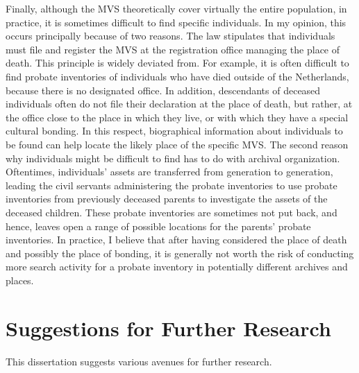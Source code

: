 Finally, although the MVS theoretically cover virtually the entire population, in practice, it is sometimes difficult to find specific individuals. In my opinion, this occurs principally because of two reasons. The law stipulates that individuals must file and register the MVS at the registration office managing the place of death. This principle is widely deviated from. For example, it is often difficult to find probate inventories of individuals who have died outside of the Netherlands, because there is no designated office. In addition, descendants of deceased individuals often do not file their declaration at the place of death, but rather, at the office close to the place in which they live, or with which they have a special cultural bonding. In this respect, biographical information about individuals to be found can help locate the likely place of the specific MVS. The second reason why individuals might be difficult to find has to do with archival organization. Oftentimes, individuals' assets are transferred from generation to generation, leading the civil servants administering the probate inventories to use probate inventories from previously deceased parents to investigate the assets of the deceased children. These probate inventories are sometimes not put back, and hence, leaves open a range of possible locations for the parents' probate inventories. In practice, I believe that after having considered the place of death and possibly the place of bonding, it is generally not worth the risk of conducting more search activity for a probate inventory in potentially different archives and places.  





\section{Suggestions for Further Research}\label{sec:sfr}


This dissertation suggests various avenues for further research. 


